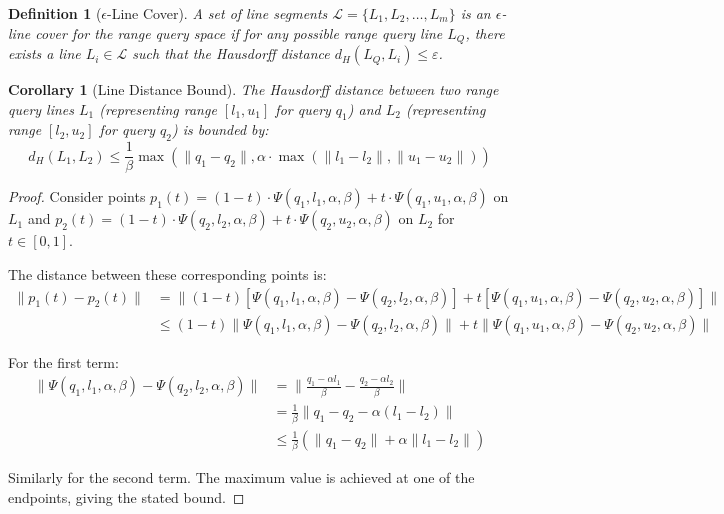 \documentclass[numbers,sort]{article}
\newtheorem{corollary}{Corollary}
\newtheorem{definition}{Definition}
\begin{document}
\begin{definition}[$\epsilon$-Line Cover]
A set of line segments $\mathcal{L} = \{L_1, L_2, \ldots, L_m\}$ is an $\epsilon$-line cover for the range query space if for any possible range query line $L_Q$, there exists a line $L_i \in \mathcal{L}$ such that the Hausdorff distance $d_H(L_Q, L_i) \leq \varepsilon$.
\end{definition}

\begin{corollary}[Line Distance Bound]
\label{thm:line-distance}
The Hausdorff distance between two range query lines $L_1$ (representing range $[l_1, u_1]$ for query $q_1$) and $L_2$ (representing range $[l_2, u_2]$ for query $q_2$) is bounded by:
\begin{equation}
d_H(L_1, L_2) \leq \frac{1}{\beta}\max(\|q_1 - q_2\|, \alpha \cdot \max(\|l_1 - l_2\|, \|u_1 - u_2\|))
\end{equation}
\end{corollary}

\begin{proof}
Consider points $p_1(t) = (1-t) \cdot \Psi(q_1, l_1, \alpha, \beta) + t \cdot \Psi(q_1, u_1, \alpha, \beta)$ on $L_1$ and $p_2(t) = (1-t) \cdot \Psi(q_2, l_2, \alpha, \beta) + t \cdot \Psi(q_2, u_2, \alpha, \beta)$ on $L_2$ for $t \in [0,1]$.

The distance between these corresponding points is:
\begin{align}
\|p_1(t) - p_2(t)\| &= \|(1-t)[\Psi(q_1, l_1, \alpha, \beta) - \Psi(q_2, l_2, \alpha, \beta)] + t[\Psi(q_1, u_1, \alpha, \beta) - \Psi(q_2, u_2, \alpha, \beta)]\| \\
&\leq (1-t)\|\Psi(q_1, l_1, \alpha, \beta) - \Psi(q_2, l_2, \alpha, \beta)\| + t\|\Psi(q_1, u_1, \alpha, \beta) - \Psi(q_2, u_2, \alpha, \beta)\|
\end{align}

For the first term:
\begin{align}
\|\Psi(q_1, l_1, \alpha, \beta) - \Psi(q_2, l_2, \alpha, \beta)\| &= \|\frac{q_1 - \alpha l_1}{\beta} - \frac{q_2 - \alpha l_2}{\beta}\| \\
&= \frac{1}{\beta}\|q_1 - q_2 - \alpha(l_1 - l_2)\| \\
&\leq \frac{1}{\beta}(\|q_1 - q_2\| + \alpha\|l_1 - l_2\|)
\end{align}

Similarly for the second term. The maximum value is achieved at one of the endpoints, giving the stated bound.
\end{proof}
\end{document}
